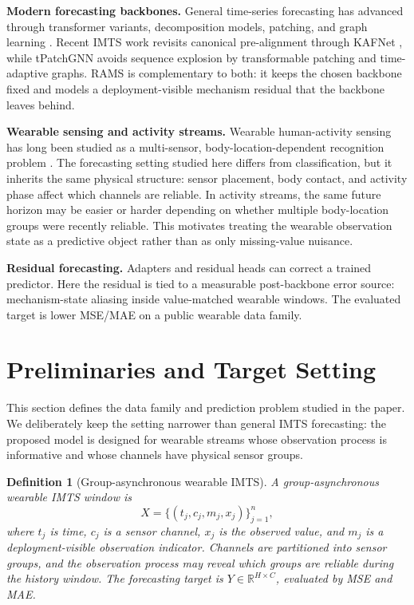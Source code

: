 ﻿\documentclass[10pt,conference]{IEEEtran}
\newtheorem{definition}{Definition}
\newcommand{\method}{\textnormal{\mbox{RAMS}}}
\newcommand{\baseT}{\textnormal{\mbox{tPatchGNN}}}
\newcommand{\baseK}{\textnormal{\mbox{KAFNet}}}
\begin{document}
\textbf{Modern forecasting backbones.}
General time-series forecasting has advanced through transformer variants,
decomposition models, patching, and graph learning
\cite{informer,autoformer,timesnet,patchtst,mtgnn}.  Recent IMTS work revisits
canonical pre-alignment through \baseK{} \cite{kafnet}, while \baseT{} avoids
sequence explosion by transformable patching and time-adaptive graphs.
\method{} is complementary to both: it keeps the chosen backbone fixed and
models a deployment-visible mechanism residual that the backbone leaves behind.

\textbf{Wearable sensing and activity streams.}
Wearable human-activity sensing has long been studied as a multi-sensor,
body-location-dependent recognition problem \cite{lara}.  The forecasting
setting studied here differs from classification, but it inherits the same
physical structure: sensor placement, body contact, and activity phase affect
which channels are reliable.  In activity streams, the same future horizon may
be easier or harder depending on whether multiple body-location groups were
recently reliable.  This motivates treating the wearable observation state as a
predictive object rather than as only missing-value nuisance.

\textbf{Residual forecasting.}
Adapters and residual heads can correct a trained predictor.  Here the residual
is tied to a measurable post-backbone error source: mechanism-state aliasing
inside value-matched wearable windows.  The evaluated target is lower MSE/MAE
on a public wearable data family.

\section{Preliminaries and Target Setting}

This section defines the data family and prediction problem studied in the
paper.  We deliberately keep the setting narrower than general IMTS
forecasting: the proposed model is designed for wearable streams whose
observation process is informative and whose channels have physical sensor
groups.

\begin{definition}[Group-asynchronous wearable IMTS]
A group-asynchronous wearable IMTS window is
\begin{equation}
X=\{(t_j,c_j,m_j,x_j)\}_{j=1}^{n},
\end{equation}
where \(t_j\) is time, \(c_j\) is a sensor channel, \(x_j\) is the observed
value, and \(m_j\) is a deployment-visible observation indicator.  Channels
are partitioned into sensor groups, and the observation process may reveal
which groups are reliable during the history window.  The forecasting target
is \(Y\in\mathbb{R}^{H\times C}\), evaluated by MSE and MAE.
\end{definition}
\end{document}
